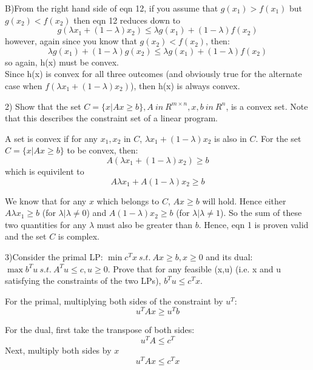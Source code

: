 \documentclass[12pt]{article}
\begin{document}
B)From the right hand side of eqn 12, if you assume that $g(x_1) > f(x_1)$ but $g(x_2) < f(x_2)$ 
then eqn 12 reduces down to
\begin{equation*}
g(\lambda x_1  +(1-\lambda)x_2 ) \leq \lambda g(x_1)+(1-\lambda)f(x_2)
\end{equation*}
however, again since you know that $g(x_2) < f(x_2)$, then: 
\begin{equation*}
\lambda g(x_1)+(1-\lambda)g(x_2) \leq \lambda g(x_1)+(1-\lambda)f(x_2)
\end{equation*}
so again, h(x) must be convex. \\

Since h(x) is convex for all three outcomes (and obviously true for the alternate case when
$f(\lambda x_1  +(1-\lambda)x_2)$), then h(x) is always convex.

\pagebreak
\setcounter{equation}{0}
2) Show that the set $C=\{x|Ax \geq b\} , A\ in\ R^{m \times n}, x,b\ in\ R^n$, is a convex set. Note that this describes the constraint set of a linear program.

A set is convex if for any $x_1,x_2$ in $C$, $\lambda x_1 + (1-\lambda)x_2$ is also in $C$.
For the set $C=\{x|Ax \geq b\}$ to be convex, then: 
\begin{equation}
    A(\lambda x_1 + (1-\lambda)x_2) \geq b
\end{equation}
which is equivilent to 
\begin{equation}
    A \lambda x_1 + A(1-\lambda)x_2 \geq b
\end{equation}

We know that for any $x$ which belongs to $C$, $Ax \geq b$ will hold. Hence 
either $A \lambda x_1 \geq b$ (for $\lambda |\lambda \neq 0$) and 
$A(1-\lambda)x_2 \geq b$ (for $\lambda |\lambda \neq 1$). So the sum of these two quantities 
for any $\lambda$ must also be greater than $b$. Hence, eqn 1 is proven valid and 
the set $C$ is complex. 

\pagebreak
\setcounter{equation}{0}
3)Consider the primal LP: $\min c^T x \ s.t. \ Ax \geq b, x \geq 0$ and its 
dual: $\max b^Tu \ s.t. \ A^Tu \leq c, u \geq 0$. Prove that for any feasible (x,u) 
(i.e. x and u satisfying the constraints of the two LPs), $b^Tu \leq c^Tx$. 

For the primal, multiplying both sides of the constraint by $u^T$: 
\begin{equation}
    u^TAx \geq u^Tb
\end{equation}

For the dual, first take the transpose of both sides: 
\begin{equation}
    u^TA \leq c^T
\end{equation}
Next, multiply both sides by $x$
\begin{equation}
    u^TAx \leq c^Tx
\end{equation}
\end{document}
